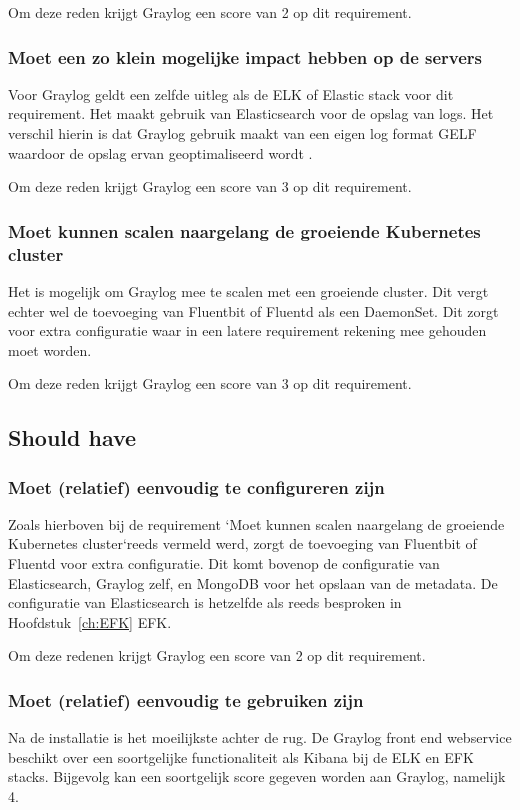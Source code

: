 Om deze reden krijgt Graylog een score van 2 op dit requirement.

\subsubsection{Moet een zo klein mogelijke impact hebben op de servers}
Voor Graylog geldt een zelfde uitleg als de ELK of Elastic stack voor dit requirement. Het maakt gebruik van Elasticsearch voor de opslag van logs. Het verschil hierin is dat Graylog gebruik maakt van een eigen log format GELF waardoor de opslag ervan geoptimaliseerd wordt \autocite{graylogdocs}.

Om deze reden krijgt Graylog een score van 3 op dit requirement.

\subsubsection{Moet kunnen scalen naargelang de groeiende Kubernetes cluster}
Het is mogelijk om Graylog mee te scalen met een groeiende cluster. Dit vergt echter wel de toevoeging van Fluentbit of Fluentd als een DaemonSet. Dit zorgt voor extra configuratie waar in een latere requirement rekening mee gehouden moet worden.

Om deze reden krijgt Graylog een score van 3 op dit requirement.

\subsection{Should have}
\subsubsection{Moet (relatief) eenvoudig te configureren zijn}
Zoals hierboven bij de requirement `Moet kunnen scalen naargelang de groeiende Kubernetes cluster`reeds vermeld werd, zorgt de toevoeging van Fluentbit of Fluentd voor extra configuratie. Dit komt bovenop de configuratie van Elasticsearch, Graylog zelf, en MongoDB voor het opslaan van de metadata. 
De configuratie van Elasticsearch is hetzelfde als reeds besproken in Hoofdstuk~\ref{ch:EFK} EFK. 

Om deze redenen krijgt Graylog een score van 2 op dit requirement.

\subsubsection{Moet (relatief) eenvoudig te gebruiken zijn}
Na de installatie is het moeilijkste achter de rug. De Graylog front end webservice beschikt over een soortgelijke functionaliteit als Kibana bij de ELK en EFK stacks. Bijgevolg kan een soortgelijk score gegeven worden aan Graylog, namelijk 4.

